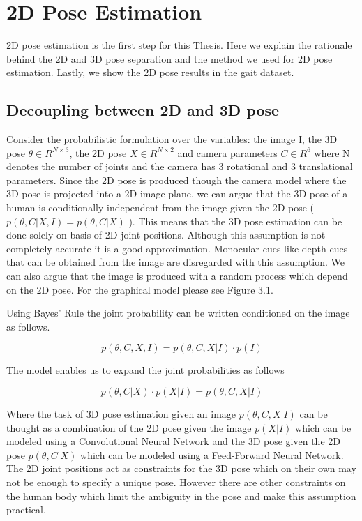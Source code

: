 
\chapter{2D Pose Estimation}\label{chapter:2dpose}

2D pose estimation is the first step for this Thesis. Here we explain the rationale behind the 2D and 3D pose separation and the method we used for 2D pose estimation. Lastly, we show the 2D pose results in the gait dataset. 

\section{Decoupling between 2D and 3D pose}

Consider the probabilistic formulation over the variables: the image I, the 3D pose $ \theta \in R^{N\times3} $, the 2D pose $X \in R^{N\times2}$ and camera parameters $ C \in R^{6} $ where N denotes the number of joints and the camera has 3 rotational and 3 translational parameters. Since the 2D pose is produced though the camera model where the 3D pose is projected into a 2D image plane, we can argue that the 3D pose of a human is conditionally independent from the image given the 2D pose ( $p(\theta,C|X,I) = p(\theta,C|X)$ ). This means that the 3D pose estimation can be done solely on basis of 2D joint positions. Although this assumption is not completely accurate it is a good approximation. Monocular cues like depth cues that can be obtained from the image are disregarded with this assumption. We can also argue that the image is produced with a random process which depend on the 2D pose. For the graphical model please see Figure 3.1.

Using Bayes' Rule the joint probability can be written conditioned on the image as follows.

\begin{equation}
    p(\theta,C,X,I) = p(\theta,C,X|I) \cdot p(I)
\end{equation}

The model enables us to expand the joint probabilities as follows

\begin{equation}
    p(\theta,C|X) \cdot p(X|I)= p(\theta,C,X|I)
\end{equation}

Where the task of 3D pose estimation given an image $p(\theta,C,X|I)$ can be thought as a combination of the 2D pose given the image $p(X|I)$ which can be modeled using a Convolutional Neural Network and the 3D pose given the 2D pose $p(\theta,C|X)$ which can be modeled using a Feed-Forward Neural Network. The 2D joint positions act as constraints for the 3D pose which on their own may not be enough to specify a unique pose. However there are other constraints on the human body which limit the ambiguity in the pose and make this assumption practical. 

